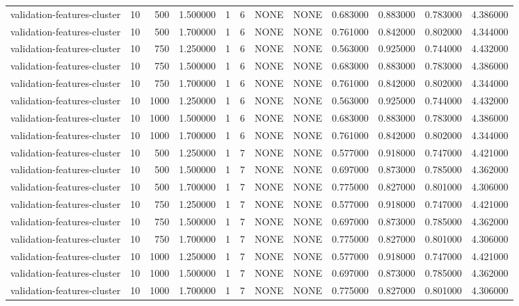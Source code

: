 \begin{tabular}{lrrrllllrrrr}
validation-features-cluster & 10 & 500 & 1.500000 & 1 & 6 & NONE & NONE & 0.683000 & 0.883000 & 0.783000 & 4.386000 \\
validation-features-cluster & 10 & 500 & 1.700000 & 1 & 6 & NONE & NONE & 0.761000 & 0.842000 & 0.802000 & 4.344000 \\
validation-features-cluster & 10 & 750 & 1.250000 & 1 & 6 & NONE & NONE & 0.563000 & 0.925000 & 0.744000 & 4.432000 \\
validation-features-cluster & 10 & 750 & 1.500000 & 1 & 6 & NONE & NONE & 0.683000 & 0.883000 & 0.783000 & 4.386000 \\
validation-features-cluster & 10 & 750 & 1.700000 & 1 & 6 & NONE & NONE & 0.761000 & 0.842000 & 0.802000 & 4.344000 \\
validation-features-cluster & 10 & 1000 & 1.250000 & 1 & 6 & NONE & NONE & 0.563000 & 0.925000 & 0.744000 & 4.432000 \\
validation-features-cluster & 10 & 1000 & 1.500000 & 1 & 6 & NONE & NONE & 0.683000 & 0.883000 & 0.783000 & 4.386000 \\
validation-features-cluster & 10 & 1000 & 1.700000 & 1 & 6 & NONE & NONE & 0.761000 & 0.842000 & 0.802000 & 4.344000 \\
validation-features-cluster & 10 & 500 & 1.250000 & 1 & 7 & NONE & NONE & 0.577000 & 0.918000 & 0.747000 & 4.421000 \\
validation-features-cluster & 10 & 500 & 1.500000 & 1 & 7 & NONE & NONE & 0.697000 & 0.873000 & 0.785000 & 4.362000 \\
validation-features-cluster & 10 & 500 & 1.700000 & 1 & 7 & NONE & NONE & 0.775000 & 0.827000 & 0.801000 & 4.306000 \\
validation-features-cluster & 10 & 750 & 1.250000 & 1 & 7 & NONE & NONE & 0.577000 & 0.918000 & 0.747000 & 4.421000 \\
validation-features-cluster & 10 & 750 & 1.500000 & 1 & 7 & NONE & NONE & 0.697000 & 0.873000 & 0.785000 & 4.362000 \\
validation-features-cluster & 10 & 750 & 1.700000 & 1 & 7 & NONE & NONE & 0.775000 & 0.827000 & 0.801000 & 4.306000 \\
validation-features-cluster & 10 & 1000 & 1.250000 & 1 & 7 & NONE & NONE & 0.577000 & 0.918000 & 0.747000 & 4.421000 \\
validation-features-cluster & 10 & 1000 & 1.500000 & 1 & 7 & NONE & NONE & 0.697000 & 0.873000 & 0.785000 & 4.362000 \\
validation-features-cluster & 10 & 1000 & 1.700000 & 1 & 7 & NONE & NONE & 0.775000 & 0.827000 & 0.801000 & 4.306000 \\

\end{tabular}
